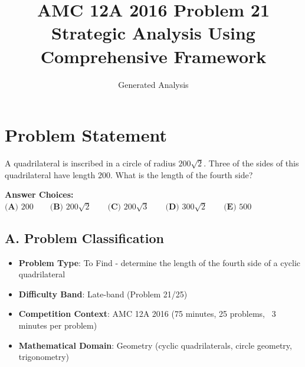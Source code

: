 \documentclass[12pt]{article}
\title{\textbf{AMC 12A 2016 Problem 21}\\Strategic Analysis Using Comprehensive Framework}
\author{Generated Analysis}
\date{}
\begin{document}
\maketitle

\section*{Problem Statement}
A quadrilateral is inscribed in a circle of radius $200\sqrt{2}$. Three of the sides of this quadrilateral have length $200$. What is the length of the fourth side?

\textbf{Answer Choices:} 
$\textbf{(A) }200\qquad \textbf{(B) }200\sqrt{2}\qquad\textbf{(C) }200\sqrt{3}\qquad\textbf{(D) }300\sqrt{2}\qquad\textbf{(E) } 500$

\begin{problemconfigbox}
\subsection*{A. Problem Classification}
\begin{itemize}[leftmargin=*]
    \item \textbf{Problem Type}: To Find - determine the length of the fourth side of a cyclic quadrilateral
    \item \textbf{Difficulty Band}: Late-band (Problem 21/25)
    \item \textbf{Competition Context}: AMC 12A 2016 (75 minutes, 25 problems, ~3 minutes per problem)
    \item \textbf{Mathematical Domain}: Geometry (cyclic quadrilaterals, circle geometry, trigonometry)
\end{itemize}


\end{problemconfigbox}
\end{document}
